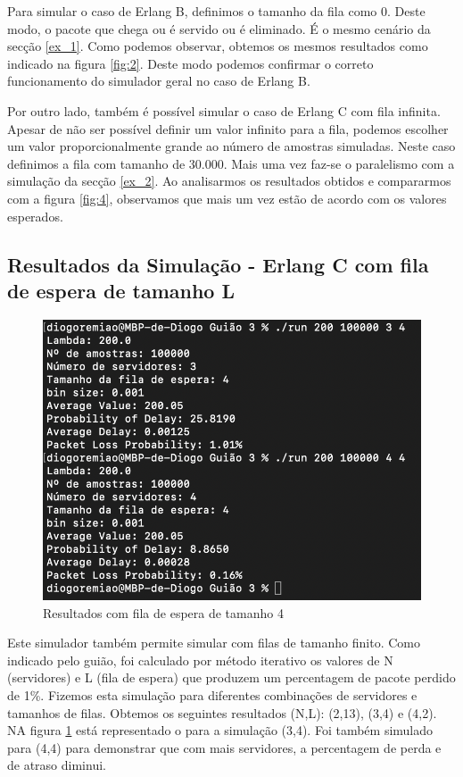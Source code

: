 Para simular o caso de Erlang B, definimos o tamanho da fila como 0. Deste modo, o pacote que chega ou é servido ou é eliminado.
É o mesmo cenário da secção \ref{ex_1}. Como podemos observar, obtemos os mesmos resultados como indicado na figura \ref{fig:2}.
Deste modo podemos confirmar o correto funcionamento do simulador geral no caso de Erlang B.

Por outro lado, também é possível simular o caso de Erlang C com fila infinita.
Apesar de não ser possível definir um valor infinito para a fila, podemos escolher um valor proporcionalmente grande ao número de amostras simuladas.
Neste caso definimos a fila com tamanho de 30.000. Mais uma vez faz-se o paralelismo com a simulação da secção \ref{ex_2}.
Ao analisarmos os resultados obtidos e compararmos com a figura \ref{fig:4}, observamos que mais um vez estão de acordo com os valores esperados.

\subsection*{Resultados da Simulação - Erlang C com fila de espera de tamanho L}

\begin{figure}[H]
    \centering
    \includegraphics[width=.8\linewidth]{figs/image_6.png}
    \caption{Resultados com fila de espera de tamanho 4}
    \label{fig:6}
\end{figure}

Este simulador também permite simular com filas de tamanho finito.
Como indicado pelo guião, foi calculado por método iterativo os valores de N (servidores) e L (fila de espera) que produzem um percentagem de pacote perdido de 1\%.
Fizemos esta simulação para diferentes combinações de servidores e tamanhos de filas.
Obtemos os seguintes resultados (N,L): (2,13), (3,4) e (4,2).
NA figura \ref{fig:6} está representado o para a simulação (3,4).
Foi também simulado para (4,4) para demonstrar que com mais servidores, a percentagem de perda e de atraso diminui.


